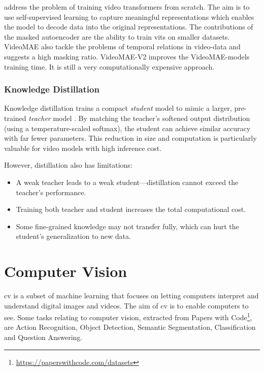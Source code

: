 \textcite{tong_videomae_2022} address the problem of training video transformers from scratch. The aim is to use self-supervised learning to capture meaningful representations which enables the model to decode data into the original representations. The contributions of the masked autoencoder \cite{tong_videomae_2022} are the ability to train \acrshort{vit}s on smaller datasets. VideoMAE \cite{tong_videomae_2022} also tackle the problems of temporal relations in video-data and suggests a high masking ratio. VideoMAE-V2 \cite{wang_videomae_2023} improves the VideoMAE-models training time. It is still a very computationally expensive approach. 


\subsubsection{Knowledge Distillation}
\label{sssec:knowledge_distillation}

Knowledge distillation trains a compact \emph{student} model to mimic a larger, pre-trained \emph{teacher} model \cite{denize_comedian_2024, li_videomamba_2024, bose_soccerkdnet_2023}. By matching the teacher's softened output distribution (using a temperature-scaled softmax), the student can achieve similar accuracy with far fewer parameters. This reduction in size and computation is particularly valuable for video models with high inference cost.

However, distillation also has limitations:
\begin{itemize}
    \item A weak teacher leads to a weak student—distillation cannot exceed the teacher's performance.
    \item Training both teacher and student increases the total computational cost.
    \item Some fine-grained knowledge may not transfer fully, which can hurt the student's generalization to new data.
\end{itemize}


\section{Computer Vision} 
\label{sec:computer_vision}

\acrfull{cv} is a subset of machine learning that focuses on letting computers interpret and understand digital images and videos. The aim of \acrlong{cv} is to enable computers to see. Some tasks relating to computer vision, extracted from Papers with Code\footnote{\url{https://paperswithcode.com/datasets}}, are Action Recognition, Object Detection, Semantic Segmentation, Classification and Question Answering. 

